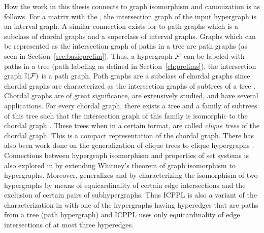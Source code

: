 How the work in this thesis connects to graph isomorphism and
canonization is as follows. For a matrix with the \COP, the
intersection graph of the input hypergraph is an interval graph.  A
similar connection exists for \TPL to path graphs which is a subclass
of chordal graphs and a superclass of interval graphs. Graphs which
can be represented as the intersection graph of paths in a tree are
path graphs (as seen in Section~\ref{sec:basicprelim}).  %
Thus, a hypergraph ${\cal F}$ can be labeled with paths in a tree (path
labeling as defined in Section~\ref{ch:prelims}), \iff the
intersection graph $\mathbb I({\cal F})$ is a path graph. Path graphs are a
subclass of chordal graphs since chordal graphs are characterized as
the intersection graphs of subtrees of a tree \cite[Ch.~4,
Sec.~5]{mcg04}. Chordal graphs are of great significance, are
extensively studied, and have several applications. For every chordal
graph, there exists a tree and a family of subtrees of this tree such
that the intersection graph of this family is isomorphic to the
chordal graph \cite{jrw72phd,gav74b,bun74}.  These trees when in a
certain format, are called {\em clique trees} \cite{ppy92} of the
chordal graph. This is a compact representation of the chordal
graph. There has also been work done on the generalization of clique
trees to clique hypergraphs \cite{km02}.  Connections between
hypergraph isomorphism and properties of set systems is also explored
in \cite{br72} by extending Whitney's theorem of graph isomorphism to
hypergraphs.  Moreover, \cite{f80} generalizes \cite{br72} and
\cite{fg65} by characterizing the isomorphism of two hypergraphs by
means of equicardinality of certain edge intersections and the
exclusion of certain pairs of subhypergraphs.  Thus ICPPL is also a
variant of the characterization in \cite{f80} with one of the
hypergraphs having hyperedges that are paths from a tree (path
hypergraph) and ICPPL uses only equicardinality of edge intersections
of at most three hyperedges.

